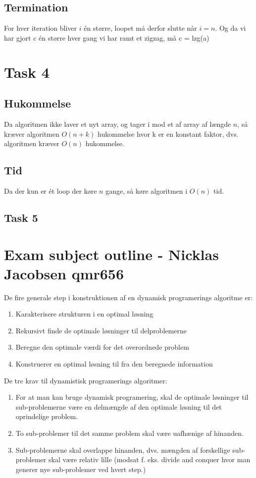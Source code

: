 \documentclass[12pt]{article}
\begin{document}
\subsection*{Termination}
For hver iteration bliver $i$ én større, loopet må derfor slutte når $i = n$. Og da vi har gjort c én større hver gang vi har ramt et zigzag, må c = lzg(a)
\section*{Task 4}
\subsection*{Hukommelse}
Da algoritmen ikke laver et nyt array, og tager i mod et af array af længde $n$, så kræver algoritmen $O(n+k)$ hukommelse hvor k er en konstant faktor, dvs. algoritmen kræver $O(n)$ hukommelse.
\subsection*{Tid}
Da der kun er ét loop der køre $n$ gange, så køre algoritmen i $O(n)$ tid.
\subsection*{Task 5}

\section*{Exam subject outline - Nicklas Jacobsen qmr656}
De fire generale step i konstruktionen af en dynamisk programerings algoritme er:
\begin{enumerate}
  \item{Karakterisere strukturen i en optimal løsning}
  \item{Rekursivt finde de optimale løsninger til delproblemerne}
  \item{Beregne den optimale værdi for det overordnede problem}
  \item{Konstruerer en optimal løsning til fra den beregnede information}
\end{enumerate}
De tre krav til dynamistisk programerings algoritmer:
\begin{enumerate}
  \item{For at man kan bruge dynamisk programering, skal de optimale løsninger til sub-problemerne være en delmængde af den optimale løsning til det oprindelige problem.}
  \item{To sub-problemer til det samme problem skal være uafhænige af hinanden.}
  \item{Sub-problemerne skal overlappe hinanden, dvs. mængden af forskellige sub-problemer skal være relativ lille (modsat f. eks. divide and conquer hvor man generer nye sub-problemer ved hvert step.)}
\end{enumerate}
\end{document}
